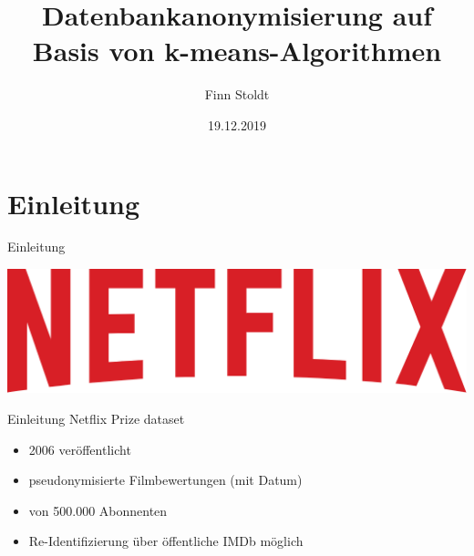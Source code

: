 \documentclass[10pt,table]{beamer}
\title{Datenbankanonymisierung auf Basis von k-means-Algorithmen}
\author{Finn Stoldt}
\date{19.12.2019}
\begin{document}
\maketitle

\section{Einleitung}
\begin{frame}{Einleitung}
    \begin{center}
         \includegraphics[scale=0.1]{Images/netflixLogo.png}
    \end{center}
\end{frame}

\begin{frame}{Einleitung}
Netflix Prize dataset
\begin{itemize}
    \item 2006 veröffentlicht
    \item pseudonymisierte Filmbewertungen (mit Datum)
    \item von 500.000 Abonnenten
    \item Re-Identifizierung über öffentliche IMDb möglich
\end{itemize}
\end{frame}
\end{document}
